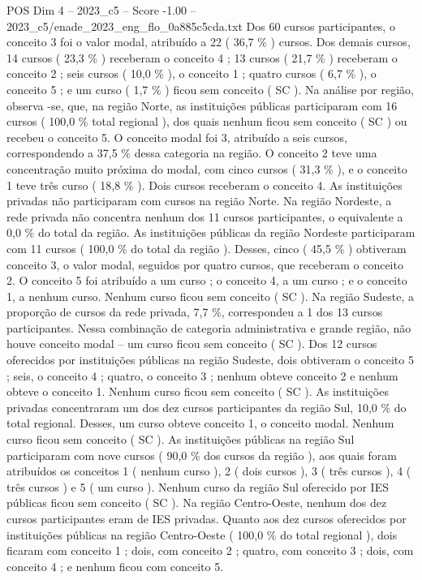 \begin{textsample}{POS Dim 4 – 2023\_c5 – Score -1.00 – 2023\_c5/enade\_2023\_eng\_flo\_0a885c5cda.txt}
Dos 60 cursos participantes, o conceito 3 foi o valor modal, atribuído a 22 ( 36,7 \% ) cursos.
Dos demais cursos, 14 cursos ( 23,3 \% ) receberam o conceito 4 ; 13 cursos ( 21,7 \% ) receberam o conceito 2 ; seis cursos ( 10,0 \% ), o conceito 1 ; quatro cursos ( 6,7 \% ), o conceito 5 ; e um curso ( 1,7 \% ) ficou sem conceito ( SC ).
Na análise por região, observa -se, que, na região Norte, as instituições públicas participaram com 16 cursos ( 100,0 \% total regional ), dos quais nenhum ficou sem conceito ( SC ) ou recebeu o conceito 5.
O conceito modal foi 3, atribuído a seis cursos, correspondendo a 37,5 \% dessa categoria na região.
O conceito 2 teve uma concentração muito próxima do modal, com cinco cursos ( 31,3 \% ), e o conceito 1 teve três curso ( 18,8 \% ).
Dois cursos receberam o conceito 4.
As instituições privadas não participaram com cursos na região Norte.
Na região Nordeste, a rede privada não concentra nenhum dos 11 cursos participantes, o equivalente a 0,0 \% do total da região.
As instituições públicas da região Nordeste participaram com 11 cursos ( 100,0 \% do total da região ).
Desses, cinco ( 45,5 \% ) obtiveram conceito 3, o valor modal, seguidos por quatro cursos, que receberam o conceito 2.
O conceito 5 foi atribuído a um curso ; o conceito 4, a um curso ; e o conceito 1, a nenhum curso.
Nenhum curso ficou sem conceito ( SC ).
Na região Sudeste, a proporção de cursos da rede privada, 7,7 \%, correspondeu a 1 dos 13 cursos participantes.
Nessa combinação de categoria administrativa e grande região, não houve conceito modal – um curso ficou sem conceito ( SC ).
Dos 12 cursos oferecidos por instituições públicas na região Sudeste, dois obtiveram o conceito 5 ; seis, o conceito 4 ; quatro, o conceito 3 ; nenhum obteve conceito 2 e nenhum obteve o conceito 1.
Nenhum curso ficou sem conceito ( SC ).
As instituições privadas concentraram um dos dez cursos participantes da região Sul, 10,0 \% do total regional.
Desses, um curso obteve conceito 1, o conceito modal.
Nenhum curso ficou sem conceito ( SC ).
As instituições públicas na região Sul participaram com nove cursos ( 90,0 \% dos cursos da região ), aos quais foram atribuídos os conceitos 1 ( nenhum curso ), 2 ( dois cursos ), 3 ( três cursos ), 4 ( três cursos ) e 5 ( um curso ).
Nenhum curso da região Sul oferecido por IES públicas ficou sem conceito ( SC ).
Na região Centro-Oeste, nenhum dos dez cursos participantes eram de IES privadas.
Quanto aos dez cursos oferecidos por instituições públicas na região Centro-Oeste ( 100,0 \% do total regional ), dois ficaram com conceito 1 ; dois, com conceito 2 ; quatro, com conceito 3 ; dois, com conceito 4 ; e nenhum ficou com conceito 5.

\end{textsample}
